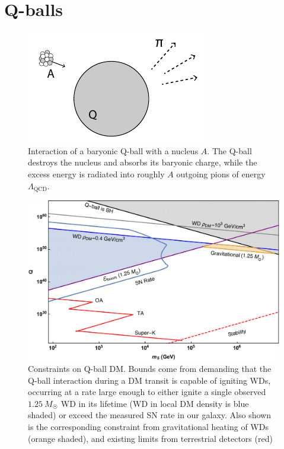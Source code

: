 \documentclass[preprintnumbers,amsmath,amssymb,prd,superscriptaddress]{revtex4}
\begin{document}
\section{Q-balls}
\label{sec:qballs}


\begin{figure}
\includegraphics[scale=1.0]{qball-cartoon.pdf}
\caption{Interaction of a baryonic Q-ball with a nucleus $A$. The Q-ball destroys the nucleus and absorbs its baryonic charge, while the excess energy is radiated into roughly $A$ outgoing pions of energy $\Lambda_\text{QCD}$.}
\label{fig:qball-cartoon}
\end{figure}

\begin{figure}
\includegraphics[scale=.35]{Qballconstraint.pdf}
\caption{
Constraints on Q-ball DM. 
Bounds come from demanding that the Q-ball interaction during a DM transit is capable of igniting WDs, occurring at a rate large enough to either ignite a single observed $1.25~M_{\astrosun}$ WD in its lifetime (WD in local DM density is blue shaded) or exceed the measured SN rate in our galaxy. 
Also shown is the corresponding constraint from gravitational heating of WDs (orange shaded), and existing limits from terrestrial detectors (red) \cite{Dine:2003ax}}
\label{fig:Qballconstraint}
\end{figure}
\end{document}
